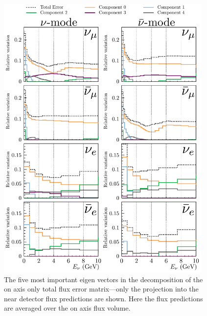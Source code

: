 \documentclass{article}
\begin{document}
\begin{figure}
  \centering
  \includegraphics[width=0.95\textwidth]{plots/EvUncerts_allpca}
  \caption{The five most important eigen vectors in the decomposition of the on axis only total flux error matrix---only the projection into the near detector flux predictions are shown. Here the flux predictions are averaged over the on axis flux volume.}
  \label{fig:evfreedom}
\end{figure}
\end{document}
